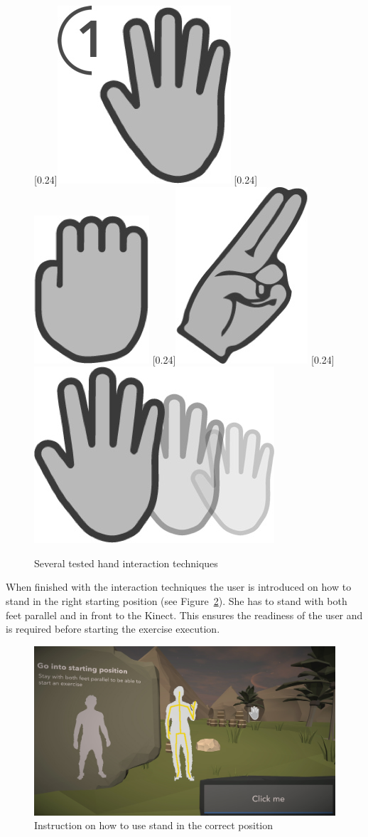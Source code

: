 \begin{figure}[htb]
	\centering
		[0.24\linewidth]{\includegraphics[width=0.14\linewidth]{Pictures/5_3_hover}}
		[0.24\linewidth]{\includegraphics[width=0.1\linewidth]{Pictures/5_3_fist}}
		[0.24\linewidth]{\includegraphics[width=0.117\linewidth]{Pictures/5_3_point}}
		[0.24\linewidth]{\includegraphics[width=0.196\linewidth]{Pictures/5_3_push2}}
	\caption{Several tested hand interaction techniques}%
	\label{fig:5_3_handInteraction}
\end{figure}

When finished with the interaction techniques the user is introduced on how to stand in the right starting position (see Figure~\ref{fig:5_3_standingPosition}). She has to stand with both feet parallel and in front to the Kinect. This ensures the readiness of the user and is required before starting the exercise execution.
\begin{figure}[htb]
	\centering
	\includegraphics[width=0.5\linewidth]{Pictures/5_Workflow/4_2_StartingPosition}
	\caption{Instruction on how to use stand in the correct position}
	\label{fig:5_3_standingPosition}
\end{figure}

